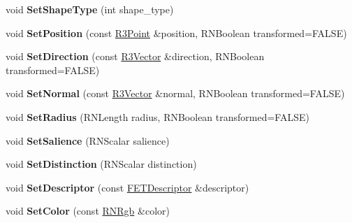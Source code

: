 \begin{DoxyCompactItemize}
\item 
void {\bfseries Set\+Shape\+Type} (int shape\+\_\+type)\hypertarget{struct_f_e_t_feature_a6b296a1febcfb89bb3194787cd4096a4}{}\label{struct_f_e_t_feature_a6b296a1febcfb89bb3194787cd4096a4}

\item 
void {\bfseries Set\+Position} (const \hyperlink{class_r3_point}{R3\+Point} \&position, R\+N\+Boolean transformed=F\+A\+L\+SE)\hypertarget{struct_f_e_t_feature_a910757f21b0bce2274a6048ea0897902}{}\label{struct_f_e_t_feature_a910757f21b0bce2274a6048ea0897902}

\item 
void {\bfseries Set\+Direction} (const \hyperlink{class_r3_vector}{R3\+Vector} \&direction, R\+N\+Boolean transformed=F\+A\+L\+SE)\hypertarget{struct_f_e_t_feature_a081d94f333cc7555ae834c00a0fce301}{}\label{struct_f_e_t_feature_a081d94f333cc7555ae834c00a0fce301}

\item 
void {\bfseries Set\+Normal} (const \hyperlink{class_r3_vector}{R3\+Vector} \&normal, R\+N\+Boolean transformed=F\+A\+L\+SE)\hypertarget{struct_f_e_t_feature_a92b36ab9a574733b6194feb6e5c7af08}{}\label{struct_f_e_t_feature_a92b36ab9a574733b6194feb6e5c7af08}

\item 
void {\bfseries Set\+Radius} (R\+N\+Length radius, R\+N\+Boolean transformed=F\+A\+L\+SE)\hypertarget{struct_f_e_t_feature_a1aa72e64fff2a5a0f02cc1d3ef17971f}{}\label{struct_f_e_t_feature_a1aa72e64fff2a5a0f02cc1d3ef17971f}

\item 
void {\bfseries Set\+Salience} (R\+N\+Scalar salience)\hypertarget{struct_f_e_t_feature_a067378b7a7b22426e29bd8583f6422f1}{}\label{struct_f_e_t_feature_a067378b7a7b22426e29bd8583f6422f1}

\item 
void {\bfseries Set\+Distinction} (R\+N\+Scalar distinction)\hypertarget{struct_f_e_t_feature_a18056d1dba7578a0050b021021fc36d2}{}\label{struct_f_e_t_feature_a18056d1dba7578a0050b021021fc36d2}

\item 
void {\bfseries Set\+Descriptor} (const \hyperlink{struct_f_e_t_descriptor}{F\+E\+T\+Descriptor} \&descriptor)\hypertarget{struct_f_e_t_feature_a5518d7f4baa6544b6b454058a378e792}{}\label{struct_f_e_t_feature_a5518d7f4baa6544b6b454058a378e792}

\item 
void {\bfseries Set\+Color} (const \hyperlink{class_r_n_rgb}{R\+N\+Rgb} \&color)\hypertarget{struct_f_e_t_feature_a48e97ce1f04da10e03424cfb3b22ab9e}{}\label{struct_f_e_t_feature_a48e97ce1f04da10e03424cfb3b22ab9e}


\end{DoxyCompactItemize}
